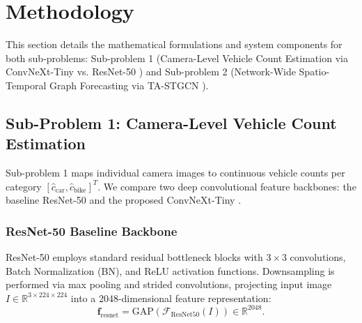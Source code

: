 \section{Methodology}

This section details the mathematical formulations and system components for both sub-problems: Sub-problem 1 (Camera-Level Vehicle Count Estimation via ConvNeXt-Tiny \cite{convnext} vs. ResNet-50 \cite{resnet}) and Sub-problem 2 (Network-Wide Spatio-Temporal Graph Forecasting via TA-STGCN \cite{stgcn, attention}).

\subsection{Sub-Problem 1: Camera-Level Vehicle Count Estimation}

Sub-problem 1 maps individual camera images to continuous vehicle counts per category $[\hat{c}_{\text{car}}, \hat{c}_{\text{bike}}]^T$. We compare two deep convolutional feature backbones: the baseline ResNet-50 \cite{resnet} and the proposed ConvNeXt-Tiny \cite{convnext}.

\subsubsection{ResNet-50 Baseline Backbone}
ResNet-50 \cite{resnet} employs standard residual bottleneck blocks with $3 \times 3$ convolutions, Batch Normalization (BN), and ReLU activation functions. Downsampling is performed via max pooling and strided convolutions, projecting input image $I \in \mathbb{R}^{3 \times 224 \times 224}$ into a 2048-dimensional feature representation:
\begin{equation}
\mathbf{f}_{\text{resnet}} = \text{GAP}\left(\mathcal{F}_{\text{ResNet50}}(I)\right) \in \mathbb{R}^{2048}.
\end{equation}

